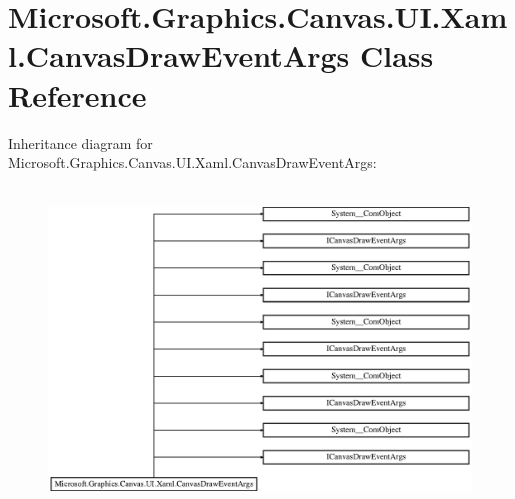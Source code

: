 \hypertarget{class_microsoft_1_1_graphics_1_1_canvas_1_1_u_i_1_1_xaml_1_1_canvas_draw_event_args}{}\section{Microsoft.\+Graphics.\+Canvas.\+U\+I.\+Xaml.\+Canvas\+Draw\+Event\+Args Class Reference}
\label{class_microsoft_1_1_graphics_1_1_canvas_1_1_u_i_1_1_xaml_1_1_canvas_draw_event_args}
Inheritance diagram for Microsoft.\+Graphics.\+Canvas.\+U\+I.\+Xaml.\+Canvas\+Draw\+Event\+Args\+:\begin{figure}[H]
\begin{center}
\leavevmode
\includegraphics[height=8.603352cm]{class_microsoft_1_1_graphics_1_1_canvas_1_1_u_i_1_1_xaml_1_1_canvas_draw_event_args}
\end{center}
\end{figure}
